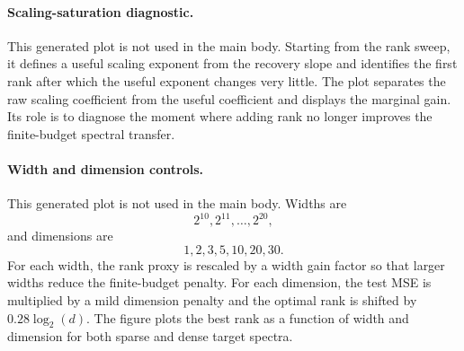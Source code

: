\paragraph{Scaling-saturation diagnostic.}
This generated plot is not used in the main body. Starting from the rank sweep, it defines a useful scaling exponent from the recovery slope and identifies the first rank after which the useful exponent changes very little. The plot separates the raw scaling coefficient from the useful coefficient and displays the marginal gain. Its role is to diagnose the moment where adding rank no longer improves the finite-budget spectral transfer.

\paragraph{Width and dimension controls.}
This generated plot is not used in the main body. Widths are
\begin{equation}
2^{10},2^{11},\ldots,2^{20},
\end{equation}
and dimensions are
\begin{equation}
1,2,3,5,10,20,30.
\end{equation}
For each width, the rank proxy is rescaled by a width gain factor so that larger widths reduce the finite-budget penalty. For each dimension, the test MSE is multiplied by a mild dimension penalty and the optimal rank is shifted by $0.28\log_2(d)$. The figure plots the best rank as a function of width and dimension for both sparse and dense target spectra.

